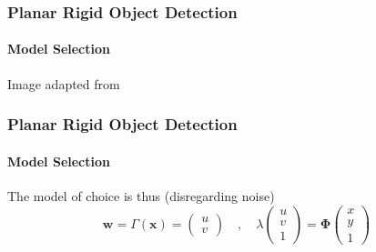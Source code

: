 \documentclass[xetex,professionalfont]{beamer}
\renewcommand{\vec}[1]{\ensuremath{\mathbf{#1}}}
\newcommand{\vw}{\vec{w}}
\newcommand{\vx}{\vec{x}}
\begin{document}

\begin{frame}
\frametitle{Planar Rigid Object Detection}
\framesubtitle{Model Selection}

\begin{center}
    {\centering Image adapted from \cite{prince12}}
\end{center}

\end{frame}


\begin{frame}
\frametitle{Planar Rigid Object Detection}
\framesubtitle{Model Selection}

The model of choice is thus (disregarding noise)  %
\[
	\vw=\Gamma(\vx)=
	\begin{pmatrix}
		u \\ v
	\end{pmatrix}\quad,\quad
	\lambda
	\begin{pmatrix}
		u \\ v \\ 1
	\end{pmatrix}
	= \boldsymbol{\Phi}
	\begin{pmatrix}
		x \\ y \\ 1
	\end{pmatrix}
\]

\end{frame}
\end{document}
